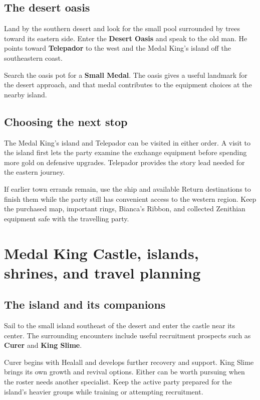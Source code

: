 \subsection*{The desert oasis}

Land by the southern desert and look for the small pool surrounded
by trees toward its eastern side. Enter the \textbf{Desert Oasis}
and speak to the old man. He points toward \textbf{Telepador} to
the west and the Medal King's island off the southeastern coast.

Search the oasis pot for a \textbf{Small Medal}. The oasis gives a
useful landmark for the desert approach, and that medal contributes
to the equipment choices at the nearby island.

\subsection*{Choosing the next stop}

The Medal King's island and Telepador can be visited in either order.
A visit to the island first lets the party examine the exchange
equipment before spending more gold on defensive upgrades. Telepador
provides the story lead needed for the eastern journey.

If earlier town errands remain, use the ship and available Return
destinations to finish them while the party still has convenient access
to the western region. Keep the purchased map, important rings, Bianca's
Ribbon, and collected Zenithian equipment safe with the travelling party.

\section{Medal King Castle, islands, shrines, and travel planning}

\subsection*{The island and its companions}

Sail to the small island southeast of the desert and enter the castle
near its center. The surrounding encounters include useful recruitment
prospects such as \textbf{Curer} and \textbf{King Slime}.

Curer begins with Healall and develops further recovery and support.
King Slime brings its own growth and revival options. Either can be
worth pursuing when the roster needs another specialist. Keep the
active party prepared for the island's heavier groups while training
or attempting recruitment.

